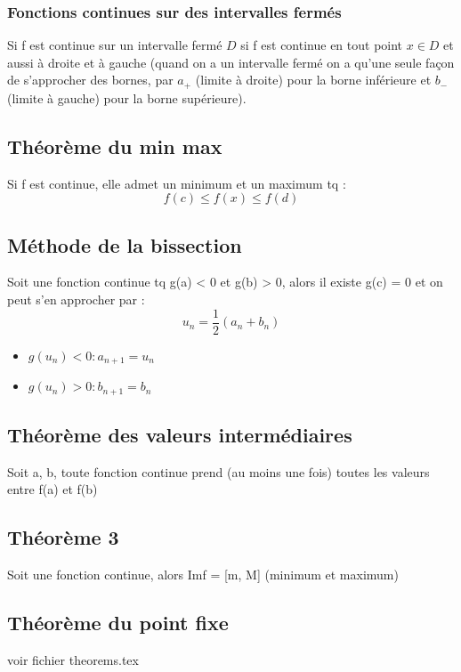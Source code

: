 \documentclass{article}
\begin{document}
\subsubsection{Fonctions continues sur des intervalles fermés}

Si f est continue sur un intervalle fermé $ D $ si f est continue en tout point $ x \in D $ et aussi à droite et à gauche (quand on a un intervalle fermé on a qu'une seule façon de s'approcher des bornes, par $ a_+ $ (limite à droite) pour la borne inférieure et $ b_- $ (limite à gauche) pour la borne supérieure).

\subsection{Théorème du min max}

Si f est continue, elle admet un minimum et un maximum tq :
\[ f(c) \leq f(x) \leq f(d)\]

\subsection{Méthode de la bissection}
Soit une fonction continue tq g(a) < 0 et g(b) > 0, alors il existe g(c) = 0 et on peut s'en approcher par : \[u_n = \frac{1}{2}(a_n + b_n)\]
\begin{itemize}
    \item $g(u_n) < 0 : a_{n+1} = u_n$
    \item $g(u_n) > 0 : b_{n+1} = b_n $
\end{itemize}

\subsection{Théorème des valeurs intermédiaires}

Soit a, b, toute fonction continue prend (au moins une fois) toutes les valeurs entre f(a) et f(b)

\subsection{Théorème 3}

Soit une fonction continue, alors Imf = [m, M] (minimum et maximum)

\subsection{Théorème du point fixe}

voir fichier theorems.tex
\end{document}
